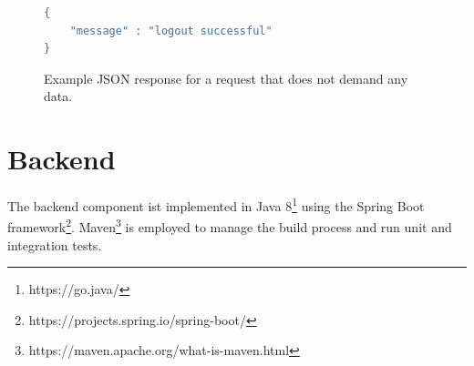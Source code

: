 \begin{figure}[h]
\begin{lstlisting}[language=Java]
{
	"message" : "logout successful"
}
\end{lstlisting}
\caption[Status API Response]{Example JSON response for a request that does not demand any data.}
\end{figure}


\section{Backend}
\label{impl:be}
The backend component ist implemented in Java 8\footnote{https://go.java/} using the Spring Boot framework\footnote{https://projects.spring.io/spring-boot/}. Maven\footnote{https://maven.apache.org/what-is-maven.html} is employed to manage the build process and run unit and integration tests.

